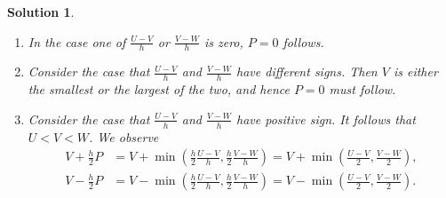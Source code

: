 \documentclass[10pt,letterpaper]{article}
\theoremstyle{break}
\newtheorem{solution}{Solution}
\begin{document}
\begin{solution}
    \begin{enumerate}
        \item 
        In the case one of $\frac{U-V}{h}$ or $\frac{V-W}{h}$ is zero, $P = 0$ follows. 
        \item 
        Consider the case that $\frac{U-V}{h}$ and $\frac{V-W}{h}$ have different signs. 
        Then $V$ is either the smallest or the largest of the two,
        and hence $P=0$ must follow.
        \item 
        Consider the case that $\frac{U-V}{h}$ and $\frac{V-W}{h}$ have positive sign.
        It follows that $U < V < W$. We observe 
        \begin{align}
            V 
            +
            \frac h 2 P
            &
            =
            V
            + 
            \min\left( \frac h 2 \frac{U-V}{h}, \frac h 2 \frac{V-W}{h} \right) 
            =
            V
            +
            \min\left( \frac{U-V}{2}, \frac{V-W}{2} \right) 
            ,
            \\
            V 
            -
            \frac h 2 P
            &
            =
            V - \min\left( \frac h 2 \frac{U-V}{h}, \frac h 2 \frac{V-W}{h} \right) 
            =
            V - \min\left( \frac{U-V}{2}, \frac{V-W}{2} \right) 
            .
        \end{align}
        
    \end{enumerate}
\end{solution}
\end{document}
